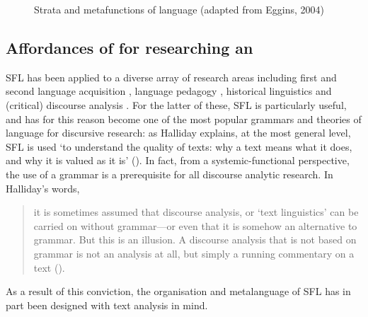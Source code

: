 \begin{figure}[htb]
\centering
{}
\caption[Strata and metafunctions of language]{Strata and metafunctions of language (adapted from Eggins, 2004)}
\label{fig:eggins}
\end{figure}

\subsection{Affordances of  for researching an }

\gls{SFL} has been applied to a diverse array of research areas including first and second language acquisition \cite{halliday1993towards,hasan_learning_1994}, language pedagogy \cite{halliday_towards_1993}, historical linguistics \cite{cummings2010introduction,martin_re/reading_2003} and (critical) discourse analysis \cite{hunston_systemic_2013,le_systematic_2009,martin_working_2003}. For the latter of these, \gls{SFL} is particularly useful, and has for this reason become one of the most popular grammars and theories of language for discursive research: as Halliday explains, at the most general level, \gls{SFL} is used `to understand the quality of texts: why a text means what it does, and why it is valued as it is' (\citeyear[p.~xxx]{halliday_introduction:_2004}). In fact, from a systemic\hyp{}functional perspective, the use of a grammar is a prerequisite for all discourse analytic research. In Halliday's words,

\begin{quote}\small\singlespacing
it is sometimes assumed that discourse analysis, or `text linguistics' can be carried on without grammar---or even that it is somehow an alternative to grammar. But this is an illusion. A discourse analysis that is not based on grammar is not an analysis at all, but simply a running commentary on a text (\citeyear[p.~xvii]{halliday_introduction:_2004}).
\end{quote}
%
As a result of this conviction, the organisation and metalanguage of \gls{SFL} has in part been designed with text analysis in mind.

